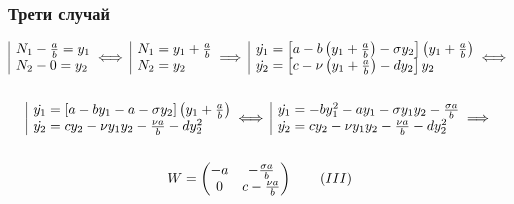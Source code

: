 \documentclass[a4paper,fleqn,12pt]{article}
\begin{document}
\subsubsection{Трети случай}
\begin{gather*}
	\begin{array}{|l@{}}
		 N_1 - \frac{a}{b} = y_1\\
		 N_2 - 0 = y_2
	\end{array} \iff 
	\begin{array}{|l@{}}
		 N_1 = y_1 + \frac{a}{b} \\
		 N_2 = y_2
	\end{array} \implies
	\begin{array}{|l@{}}
		\dot{y_1} = \left[a - b \left(y_1 + \frac{a}{b} \right) - \sigma y_2 \right] \left(y_1 + \frac{a}{b} \right)\\
		\dot{y_2} = \left[c - \nu \left(y_1 + \frac{a}{b} \right) - dy_2 \right] y_2 
	\end{array} \iff \\ \\
	\begin{array}{|l@{}}
		\dot{y_1} = \left[a - b y_1 -a - \sigma y_2 \right] \left(y_1 + \frac{a}{b} \right)\\
		\dot{y_2} =  c y_2 - \nu y_1 y_2 - \frac{\nu a}{b}- dy_2  ^2  
	\end{array} \iff 
	\begin{array}{|l@{}}
		\dot{y_1} = - b y_1 ^2 - ay_1 - \sigma y_1 y_2 - \frac{\sigma a}{b} \\
		\dot{y_2} =  c y_2 - \nu y_1 y_2 - \frac{\nu a}{b}- dy_2  ^2  
	\end{array}
	\implies \\ \\ 
	W = \begin{pmatrix} -a & - \frac{\sigma a}{b}\\0& c - \frac{\nu a}{b} \end{pmatrix} \tag{$III$}
\end{gather*}
\end{document}
